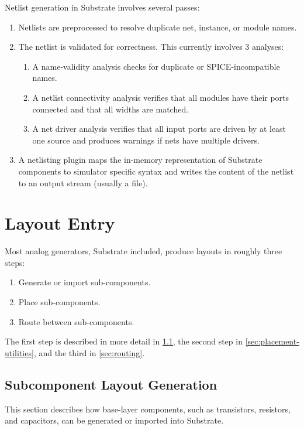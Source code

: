 Netlist generation in Substrate involves several passes:
\begin{enumerate}
\item Netlists are preprocessed to resolve duplicate net, instance, or module names.
\item The netlist is validated for correctness. This currently involves 3 analyses:
\begin{enumerate}
  \item A name-validity analysis checks for duplicate or SPICE-incompatible names.
  \item A netlist connectivity analysis verifies that all modules have their ports connected and that all widths are matched.
  \item A net driver analysis verifies that all input ports are driven by at least one source and produces warnings if nets have multiple drivers.
\end{enumerate}
\item A netlisting plugin maps the in-memory representation of Substrate components to simulator specific syntax and writes the content of the netlist to an output stream (usually a file).
\end{enumerate}

\section{Layout Entry} \label{sec:layout-entry}

Most analog generators, Substrate included, produce layouts in roughly three steps:
\begin{enumerate}
\item Generate or import sub-components.
\item Place sub-components.
\item Route between sub-components.
\end{enumerate}

The first step is described in more detail in \ref{sec:subcomponent-layout-generation},
the second step in \ref{sec:placement-utilities}, and the third in \ref{sec:routing}.

\subsection{Subcomponent Layout Generation} \label{sec:subcomponent-layout-generation}

This section describes how base-layer components, such as transistors, resistors, and capacitors, can be generated or imported into Substrate.

